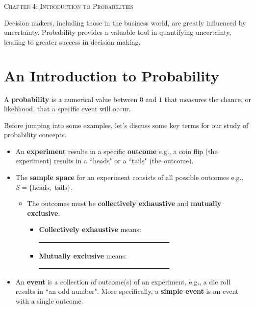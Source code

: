 \documentclass[12pt, letterpaper]{article}
\theoremstyle{definition}
\begin{document}


\begin{center}

{\LARGE \textsc{Chapter 4:  Introduction to Probabilities}}
\end{center}


\noindent  Decision makers, including those in the business world, are greatly influenced by uncertainty.  Probability provides a valuable tool in quantifying uncertainty, leading to greater success in decision-making.

\section*{An Introduction to Probability}

\begin{defn}
A \textbf{probability} is a numerical value between $0$ and $1$ that measures the chance, or likelihood, that a specific event will occur.  
\end{defn}

\noindent Before jumping into some examples, let's discuss some key terms for our study of probability concepts.

\begin{defn}
\begin{itemize}

\item An \textbf{experiment} results in a specific \textbf{outcome} e.g., a coin flip (the experiment) results in a ``heads" or a ``tails" (the outcome).

\item The \textbf{sample space} for an experiment consists of all possible outcomes e.g., $S=\{ \text{heads}, \text{ tails}\}$.  
\begin{itemize}
\item The outcomes must be \textbf{collectively exhaustive} and \textbf{mutually exclusive}.
\begin{itemize}
\item \textbf{Collectively exhaustive} means:  \underline{~~~~~~~~~~~~~~~~~~~~~~~~~~~~~~~~~~~~~~}
\vspace*{.1in}
\item \textbf{Mutually exclusive} means: \underline{~~~~~~~~~~~~~~~~~~~~~~~~~~~~~~~~~~~~~~}
\end{itemize}
\end{itemize}


\item An \textbf{event} is a collection of outcome(s) of an experiment, e.g., a die roll results in ``an odd number".  More specifically, a \textbf{simple event} is an event with a single outcome.

\end{itemize}
\end{defn}
\end{document}
